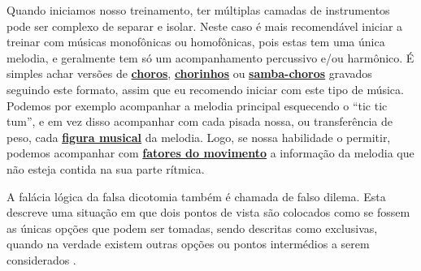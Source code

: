 \begin{example}
Quando iniciamos nosso treinamento, 
ter múltiplas camadas de instrumentos pode ser complexo de separar e isolar.
Neste caso é mais recomendável iniciar a treinar com músicas monofônicas ou  homofônicas,
pois estas tem uma única melodia, e geralmente tem só um acompanhamento percussivo e/ou harmônico.
É simples achar versões de \hyperref[subsec:musicchoro]{\textbf{choros}}, 
\hyperref[subsec:musicchoro]{\textbf{chorinhos}} ou 
\hyperref[subsec:musicsambachoro]{\textbf{samba-choros}} gravados seguindo este formato,
assim que eu recomendo iniciar com este tipo de música.
Podemos por exemplo acompanhar a melodia principal esquecendo o ``tic tic tum'',
e em vez disso acompanhar com cada pisada nossa, ou transferência de peso, 
cada \hyperref[sec:figurasmusicais]{\textbf{figura musical}} da melodia. Logo, 
se nossa habilidade o permitir, podemos acompanhar com \hyperref[subsec:fatordinamica]{\textbf{fatores do movimento}}
a informação da melodia que não esteja contida na sua parte rítmica.
\end{example}






\begin{elaboracion}[title=Falácia lógica da falsa dicotomia, width= 1.0\linewidth]
\label{ref:falsadilema}
A falácia lógica da falsa dicotomia também é chamada de falso dilema. 
Esta descreve uma situação em que dois pontos de vista são colocados 
como se fossem as únicas opções que podem ser tomadas, sendo descritas como exclusivas,
quando na verdade existem outras opções ou pontos intermédios a serem considerados
\cite[pp. 163]{rainbolt2012critical}.
\end{elaboracion}


